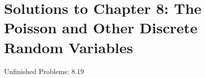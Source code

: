 \documentclass[10pt, oneside]{article}
\begin{document}
\newpage


\setcounter{cor}{0}
\setcounter{prop}{0}
\setcounter{cor*}{0}

{}
\section*{Solutions to Chapter 8: The Poisson and Other Discrete Random Variables}

Unfinished Problems: 8.19
\end{document}

